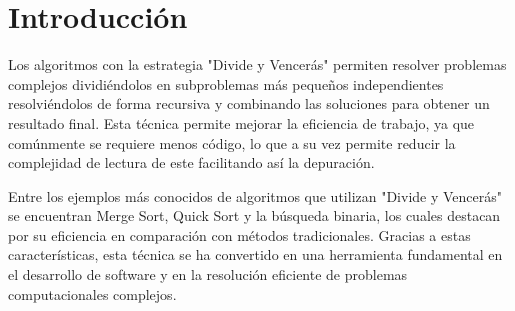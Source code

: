 \section{Introducción}

Los algoritmos con la estrategia "Divide y Vencerás" permiten resolver problemas complejos dividiéndolos en subproblemas más pequeños independientes resolviéndolos de forma recursiva y combinando las soluciones para obtener un resultado final.
Esta técnica permite mejorar la eficiencia de trabajo, ya que comúnmente se requiere menos código, lo que a su vez permite reducir la complejidad de lectura de este facilitando así la depuración.

Entre los ejemplos más conocidos de algoritmos que utilizan "Divide y Vencerás" se encuentran Merge Sort, Quick Sort y la búsqueda binaria, los cuales destacan por su eficiencia en comparación con métodos tradicionales. 
Gracias a estas características, esta técnica se ha convertido en una herramienta fundamental en el desarrollo de software y en la resolución eficiente de problemas computacionales complejos.